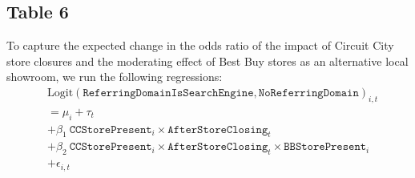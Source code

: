 \documentclass{article}
\begin{document}
\subsection{Table 6}
To capture the expected change in the odds ratio of the impact of Circuit City store closures and
the moderating effect of Best Buy stores as an alternative local showroom, we run the following regressions:
\begin{equation}
	\begin{aligned}
		& \textrm{Logit}\left( \texttt{ReferringDomainIsSearchEngine}, \texttt{NoReferringDomain} \right)_{i,t} \\ &= \mu_{i} + \tau_{t} 
		\\ &+ \beta_1 \ \texttt{CCStorePresent}_i \times \texttt{AfterStoreClosing}_t 
		\\ &+ \beta_2 \ \texttt{CCStorePresent}_i \times \texttt{AfterStoreClosing}_t \times \texttt{BBStorePresent}_i \\ & + \epsilon_{i,t}
	\end{aligned}
\end{equation}
\end{document}
